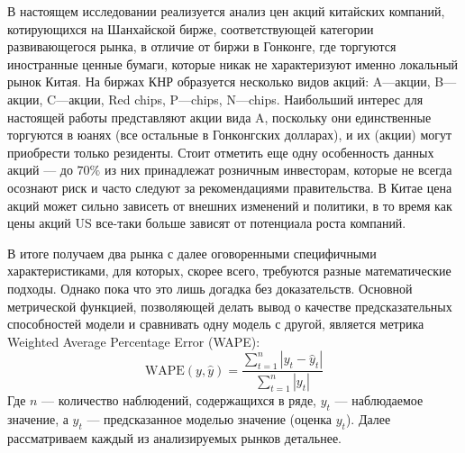 В настоящем исследовании реализуется анализ цен акций китайских компаний, котирующихся на Шанхайской бирже, соответствующей категории развивающегося рынка, в отличие от биржи в Гонконге, где торгуются иностранные ценные бумаги, которые никак не характеризуют именно локальный рынок Китая. На биржах КНР образуется несколько видов акций: A---акции, B---акции, C---акции, Red chips, P---chips, N---chips. Наибольший интерес для настоящей работы представляют акции вида A, поскольку они единственные торгуются в юанях (все остальные в Гонконгских долларах), и их (акции) могут приобрести только резиденты. Стоит отметить еще одну особенность данных акций --- до $70\%$ из них принадлежат розничным инвесторам, которые не всегда осознают риск и часто следуют за рекомендациями правительства. В Китае цена акций может сильно зависеть от внешних изменений и политики, в то время как цены акций US все-таки больше зависят от потенциала роста компаний.

В итоге получаем два рынка с далее оговоренными специфичными характеристиками, для которых, скорее всего, требуются разные математические подходы. Однако пока что это лишь догадка без доказательств. Основной метрической функцией, позволяющей делать вывод о качестве предсказательных способностей модели и сравнивать одну модель с другой, является метрика Weighted Average Percentage Error (WAPE):
\begin{equation}
	\text{WAPE}(y, \hat{y}) = \frac{\sum_{t = 1}^n |y_t - \hat{y}_t|}{\sum_{t = 1}^n |y_t|}
\end{equation}
\noindent Где $n$ --- количество наблюдений, содержащихся в ряде, $y_t$ --- наблюдаемое значение, а $\hat{y}_t$ --- предсказанное моделью значение (оценка $y_t$). Далее рассматриваем каждый из анализируемых рынков детальнее.

